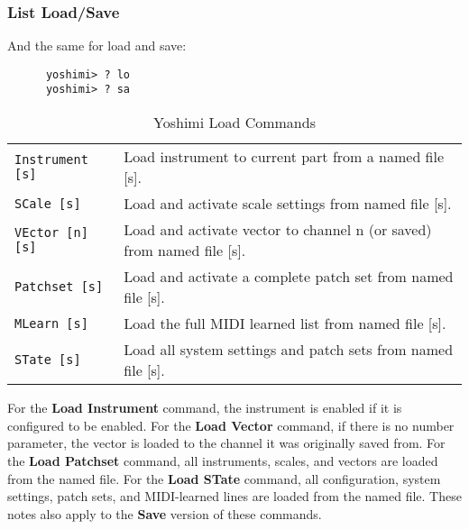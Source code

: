 \subsubsection{List Load/Save}
\label{subsec:command_line_loadsave_list}

   And the same for load and save:

   \begin{verbatim}
      yoshimi> ? lo
      yoshimi> ? sa
   \end{verbatim}

   \begin{table}[H]
      \centering
      \caption{Yoshimi Load Commands}
      \label{table:yoshimi_text_load_commands}
      \begin{tabular}{l l}

\texttt{Instrument [s]} &
   Load instrument to current part from a named file [s]. \\
\texttt{SCale [s]} &
   Load and activate scale settings from named file [s]. \\
\texttt{VEctor [n] [s]} &
   Load and activate vector to channel n (or saved) from named file [s]. \\
\texttt{Patchset [s]} &
   Load and activate a complete patch set from named file [s]. \\
\texttt{MLearn [s]} &
   Load the full MIDI learned list from named file [s]. \\
\texttt{STate [s]} &
   Load all system settings and patch sets from named file [s]. \\

      \end{tabular}
   \end{table}

   For the \textbf{Load Instrument} command, the instrument is enabled if it
   is configured to be enabled.  For the \textbf{Load Vector} command, if
   there is no number parameter, the vector is loaded to the channel it was
   originally saved from.
   For the \textbf{Load Patchset} command, all instruments, scales, and
   vectors are loaded from the named file.
   For the \textbf{Load STate} command, all configuration, system settings,
   patch sets, and MIDI-learned lines are loaded from the named file.
   These notes also apply to the \textbf{Save} version of these commands.

